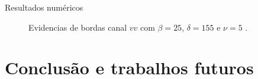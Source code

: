 \documentclass[10pt]{beamer}
\begin{document}
\begin{frame}{Resultados numéricos}
\begin{figure}[hbt]
	\caption{Evidencias de bordas canal $vv$ com $\beta = 25$, $\delta = 155$ e $\nu = 5$ .}
\label{cap_acf_fig16}
\endminipage\hfill
\end{figure}

\end{frame}


\section{Conclusão e trabalhos futuros}
\end{document}
